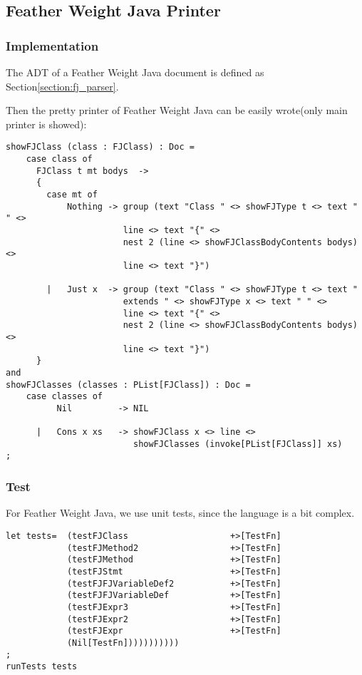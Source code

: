 \subsection{Feather Weight Java Printer}

\subsubsection{Implementation}
The ADT of a Feather Weight Java document is defined as Section\ref{section:fj_parser}.


Then the pretty printer of Feather Weight Java can be easily wrote(only main printer is showed):

\begin{lstlisting}
showFJClass (class : FJClass) : Doc =
    case class of
      FJClass t mt bodys  ->
      {
        case mt of
            Nothing -> group (text "Class " <> showFJType t <> text " " <>
                       line <> text "{" <>
                       nest 2 (line <> showFJClassBodyContents bodys) <>
                       line <> text "}")

        |   Just x  -> group (text "Class " <> showFJType t <> text "
                       extends " <> showFJType x <> text " " <>
                       line <> text "{" <>
                       nest 2 (line <> showFJClassBodyContents bodys) <>
                       line <> text "}")
      }
and
showFJClasses (classes : PList[FJClass]) : Doc =
    case classes of
          Nil         -> NIL

      |   Cons x xs   -> showFJClass x <> line <>
                         showFJClasses (invoke[PList[FJClass]] xs)
;
\end{lstlisting}

\subsubsection{Test}

For Feather Weight Java, we use unit tests, since the language is a bit complex.

\begin{lstlisting}
let tests=  (testFJClass                    +>[TestFn]
            (testFJMethod2                  +>[TestFn]
            (testFJMethod                   +>[TestFn]
            (testFJStmt                     +>[TestFn]
            (testFJFJVariableDef2           +>[TestFn]
            (testFJFJVariableDef            +>[TestFn]
            (testFJExpr3                    +>[TestFn]
            (testFJExpr2                    +>[TestFn]
            (testFJExpr                     +>[TestFn]
            (Nil[TestFn]))))))))))
;
runTests tests
\end{lstlisting}

